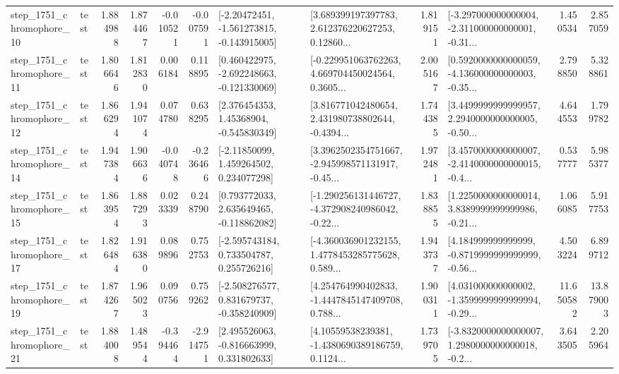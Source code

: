 \begin{tabular}{llrrrrllrlrr}
 step\_1751\_chromophore\_10 &      test &      1.884988 &    1.874467 &     -0.010521 & -0.007591 &   [-2.20472451, -1.561273815, -0.143915005] &  [3.689399197397783, 2.612376220627253, 0.12860... &       1.819151 &  [-3.297000000000004, -2.311000000000001, -0.31... &            1.450534 &          2.857059 \\
 step\_1751\_chromophore\_11 &      test &      1.806646 &    1.812830 &      0.006184 &  0.118895 &   [0.460422975, -2.692248663, -0.121330069] &  [-0.229951063762263, 4.669704450024564, 0.3605... &       2.005167 &  [0.5920000000000059, -4.136000000000003, -0.35... &            2.798850 &          5.328861 \\
 step\_1751\_chromophore\_12 &      test &      1.866294 &    1.941074 &      0.074780 &  0.638295 &     [2.376454353, 1.45368904, -0.545830349] &  [3.816771042480654, 2.431980738802644, -0.4394... &       1.744385 &  [3.4499999999999957, 2.2940000000000005, -0.50... &            4.644553 &          1.799782 \\
 step\_1751\_chromophore\_14 &      test &      1.947384 &    1.906636 &     -0.040748 & -0.236466 &     [-2.11850099, 1.459264502, 0.234077298] &  [3.3962502354751667, -2.945998571131917, -0.45... &       1.972481 &  [3.4570000000000007, -2.4140000000000015, -0.4... &            0.537777 &          5.985377 \\
 step\_1751\_chromophore\_15 &      test &      1.863954 &    1.887293 &      0.023339 &  0.248790 &    [0.793772033, 2.635649465, -0.118862082] &  [-1.290256131446727, -4.372908240986042, -0.22... &       1.838855 &  [1.2250000000000014, 3.8389999999999986, -0.21... &            1.066085 &          5.917753 \\
 step\_1751\_chromophore\_17 &      test &      1.826484 &    1.916380 &      0.089896 &  0.752753 &    [-2.595743184, 0.733504787, 0.255726216] &  [-4.360036901232155, 1.4778453285775628, 0.589... &       1.943737 &  [4.184999999999999, -0.8719999999999999, -0.56... &            4.503224 &          6.899712 \\
 step\_1751\_chromophore\_19 &      test &      1.874267 &    1.965023 &      0.090756 &  0.759262 &   [-2.508276577, 0.831679737, -0.358240909] &  [4.254764990402833, -1.4447845147409708, 0.788... &       1.900311 &  [4.031000000000002, -1.3599999999999994, -0.29... &           11.650582 &         13.879003 \\
 step\_1751\_chromophore\_21 &      test &      1.884008 &    1.489544 &     -0.394464 & -2.914751 &    [2.495526063, -0.816663999, 0.331802633] &  [4.10559538239381, -1.4380690389186759, 0.1124... &       1.739705 &  [-3.8320000000000007, 1.2980000000000018, -0.2... &            3.643505 &          2.205964 \\

\end{tabular}
